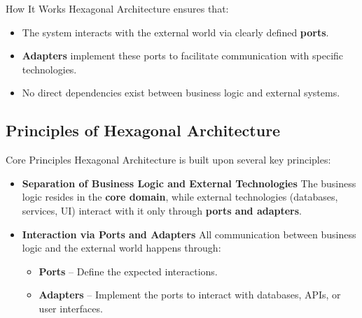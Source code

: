 \documentclass[aspectratio=169, table]{beamer}
\begin{document}
\begin{frame}[fragile]{How It Works}
	\vspace{20pt}
	Hexagonal Architecture ensures that:
	\begin{itemize}
		\item The system interacts with the external world via clearly defined \textbf{ports}.
		\item \textbf{Adapters} implement these ports to facilitate communication with specific technologies.
		\item No direct dependencies exist between business logic and external systems.
	\end{itemize}
\end{frame}

\subsection{Principles of Hexagonal Architecture}

\begin{frame}[fragile]{Core Principles}
	\vspace{20pt}
	Hexagonal Architecture is built upon several key principles:
	\begin{itemize}
		\item \textbf{Separation of Business Logic and External Technologies}  
		The business logic resides in the \textbf{core domain}, while external technologies (databases, services, UI) interact with it only through \textbf{ports and adapters}.
		
		\item \textbf{Interaction via Ports and Adapters}  
		All communication between business logic and the external world happens through:
		\begin{itemize}
			\item \textbf{Ports} – Define the expected interactions.
			\item \textbf{Adapters} – Implement the ports to interact with databases, APIs, or user interfaces.
		\end{itemize}
	\end{itemize}
\end{frame}
\end{document}
